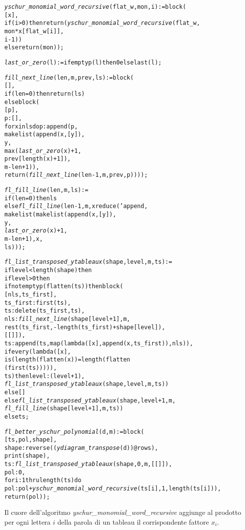 \begin{alltt}
\emph{yschur\_monomial\_word\_recursive} (flat\_w, mon, i) := block (
  [x],
  if (i>0) then return (\emph{yschur\_monomial\_word\_recursive} (flat\_w,
                                                        mon*x[flat\_w[i]],
                                                        i-1))
  else return (mon));

\emph{last\_or\_zero} (l) := if emptyp (l) then 0 else last(l);

\emph{fill\_next\_line} (len, m, prev, ls) := block (
  [],
  if (len = 0) then return (ls)
  else block (
    [p],
    p : [],
    for x in ls do p : append (p,
                               makelist (append (x, [y]),
                               y,
                               max (\emph{last\_or\_zero} (x) + 1,
                                    prev[length (x)+1]),
                               m - len + 1)),
    return (\emph{fill\_next\_line} (len - 1, m, prev, p))));


\emph{fl\_fill\_line} (len, m, ls) :=
if (len=0) then ls
else \emph{fl\_fill\_line} (len-1, m, xreduce ('append, 
                                       makelist (makelist (append (x, [y]),
                                                 y,
                                                 \emph{last\_or\_zero} (x) + 1,
                                                 m - len +1), x,
                                                 ls)));

\emph{fl\_list\_transposed\_ytableaux} (shape, level, m, ts) :=
if level < length (shape) then
  if level > 0 then
    if not emptyp (flatten (ts)) then block (
      [nls,ts\_first],
      ts\_first : first (ts),
      ts : delete (ts\_first, ts),
      nls : \emph{fill\_next\_line} (shape [level+1], m,
                            rest (ts\_first, -length(ts\_first)+shape[level]),
                            [[]]),
      ts : append (ts, map (lambda ([x], append (x, ts\_first)), nls)),
      if every (lambda ([x],
                        is (length (flatten (x)) = length (flatten
                        (first (ts))))),
                ts) then level : (level + 1),
      \emph{fl\_list\_transposed\_ytableaux} (shape, level, m, ts))
    else []
  else \emph{fl\_list\_transposed\_ytableaux} (shape, level + 1, m,
                                     \emph{fl\_fill\_line} (shape[level + 1], m, ts))
else ts;

\emph{fl\_better\_yschur\_polynomial} (d, m) := block (
  [ts, pol, shape],
  shape : reverse ((\emph{ydiagram\_transpose} (d))@rows),
  print (shape),
  ts : \emph{fl\_list\_transposed\_ytableaux} (shape, 0, m, [[]]),
  pol : 0,
  for i : 1 thru length (ts) do
    pol : pol + \emph{yschur\_monomial\_word\_recursive} (ts[i], 1, length (ts[i])),
  return (pol));
\end{alltt}

Il cuore dell'algoritmo
\emph{yschur\_monomial\_word\_recursive} aggiunge al prodotto per ogni lettera $i$
della parola di un tableau il corrispondente fattore $x_i$.
 
